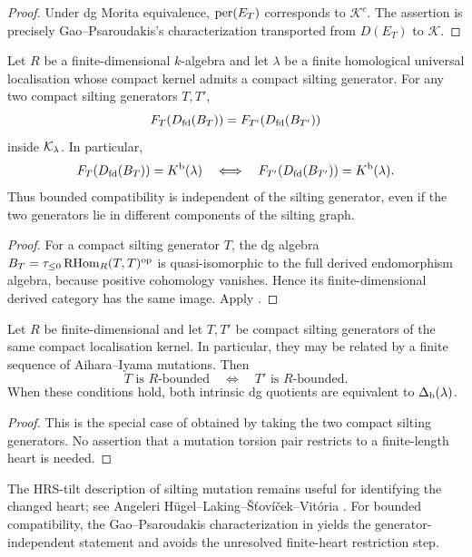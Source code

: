 \begin{proof}
Under dg Morita equivalence, \(\operatorname{per}(E_T)\) corresponds to \(\mathcal K^c\).  The assertion is precisely Gao--Psaroudakis's characterization transported from \(D(E_T)\) to \(\mathcal K\).
\end{proof}

\begin{corollary}\label{cor:rbounded-generator-independent}
Let \(R\) be a finite-dimensional \(k\)-algebra and let \(\lambda\) be a finite homological universal localisation whose compact kernel admits a compact silting generator.  For any two compact silting generators \(T,T'\),
\[
 F_T(D_{\mathrm{fd}}(B_T))=F_{T'}(D_{\mathrm{fd}}(B_{T'}))
\]
inside \(\mathcal K_\lambda\).  In particular,
\[
 F_T(D_{\mathrm{fd}}(B_T))=K^{\mathrm b}(\lambda)
 \quad\Longleftrightarrow\quad
 F_{T'}(D_{\mathrm{fd}}(B_{T'}))=K^{\mathrm b}(\lambda).
\]
Thus bounded compatibility is independent of the silting generator, even if the two generators lie in different components of the silting graph.
\end{corollary}

\begin{proof}
For a compact silting generator \(T\), the dg algebra
\(B_T=\tau_{\le0}\operatorname{RHom}_R(T,T)^{\mathrm{op}}\) is quasi-isomorphic to the full derived endomorphism algebra, because positive cohomology vanishes.  Hence its finite-dimensional derived category has the same image.  Apply .
\end{proof}

\begin{corollary}\label{cor:mutation-stability}
Let \(R\) be finite-dimensional and let \(T,T'\) be compact silting generators of the same compact localisation kernel.  In particular, they may be related by a finite sequence of Aihara--Iyama mutations.  Then
\[
 T\text{ is }R\text{-bounded}
 \quad\Longleftrightarrow\quad
 T'\text{ is }R\text{-bounded}.
\]
When these conditions hold, both intrinsic dg quotients are equivalent to \(\Delta_{\mathrm b}(\lambda)\).
\end{corollary}

\begin{proof}
This is the special case of  obtained by taking the two compact silting generators.  No assertion that a mutation torsion pair restricts to a finite-length heart is needed.
\end{proof}

\begin{remark}
The HRS-tilt description of silting mutation remains useful for identifying the changed heart; see Angeleri H\"ugel--Laking--\v{S}\v{t}ov\'{i}\v{c}ek--Vit\'{o}ria \cite{ALSV25}.  For bounded compatibility, the Gao--Psaroudakis characterization in  yields the generator-independent statement and avoids the unresolved finite-heart restriction step.
\end{remark}
